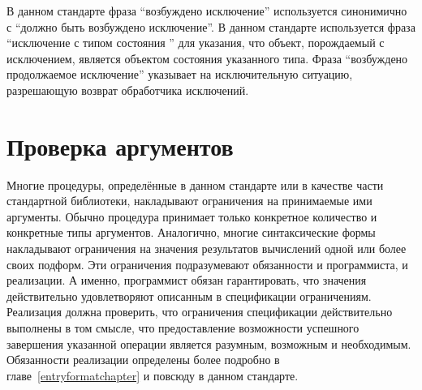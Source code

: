 В данном стандарте фраза ``возбуждено исключение'' используется синонимично с ``должно быть возбуждено
исключение''. В данном стандарте используется фраза ``исключение с типом состояния '' для указания,
что объект, порождаемый с исключением, является объектом состояния указанного типа. Фраза
``возбуждено продолжаемое исключение'' указывает на исключительную ситуацию, разрешающую возврат обработчика
исключений.

\section{Проверка аргументов}
\label{argumentcheckingsection}

Многие процедуры, определённые в данном стандарте или в качестве части стандартной библиотеки,
накладывают ограничения на принимаемые ими аргументы. Обычно процедура принимает только
конкретное количество и конкретные типы аргументов. Аналогично, многие синтаксические формы
накладывают ограничения на значения результатов вычислений одной или более своих подформ. Эти
ограничения подразумевают обязанности и программиста, и реализации. А
именно, программист обязан гарантировать, что значения действительно удовлетворяют описанным в
спецификации ограничениям. Реализация должна проверить, что ограничения спецификации
действительно выполнены в том смысле, что предоставление возможности успешного завершения
указанной операции является разумным, возможным и необходимым. Обязанности реализации определены
более подробно в главе~\ref{entryformatchapter} и повсюду в данном стандарте.


